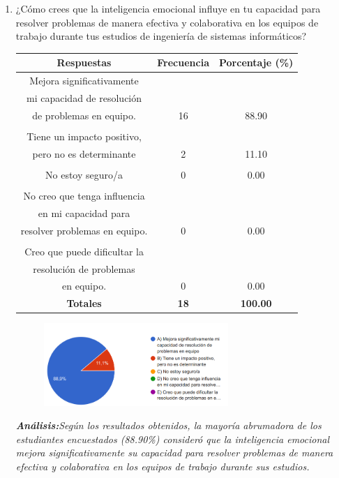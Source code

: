 \documentclass[journal]{IEEEtran}
\begin{document}
\begin{enumerate}
\item¿Cómo crees que la inteligencia emocional influye en tu capacidad para resolver problemas de manera efectiva y colaborativa en los equipos de trabajo durante tus estudios de ingeniería de sistemas informáticos?
	\begin{table}[H]
		\renewcommand{\arraystretch}{1.3}
		\centering
		\begin{tabular}{c c c}
			\hline
			\textbf{Respuestas} & \textbf{Frecuencia} & \textbf{Porcentaje (\%)}\\
			\hline
			Mejora significativamente \\mi capacidad de resolución \\de problemas en equipo. & 16 & 88.90 \\
			\\Tiene un impacto positivo, \\pero no es determinante & 2 & 11.10 \\
			\\No estoy seguro/a & 0 & 0.00\\
			\\No creo que tenga influencia \\en mi capacidad para \\resolver problemas en equipo. & 0 & 0.00\\
			\\Creo que puede dificultar la \\resolución de problemas \\en equipo. & 0 & 0.00\\
			\hline
			\textbf{Totales} &\textbf{18}& \textbf{100.00}\\
			\hline
		\end{tabular}
	\end{table}
	\begin{figure}[h]
		\centering
		\includegraphics[width=07cm]{Pregunta 8}
	\end{figure}
	\textit{\textbf{Análisis:}Según los resultados obtenidos, la mayoría abrumadora de los estudiantes encuestados (88.90\%) consideró que la inteligencia emocional mejora significativamente su capacidad para resolver problemas de manera efectiva y colaborativa en los equipos de trabajo durante sus estudios.
}
\end{enumerate}
\end{document}
